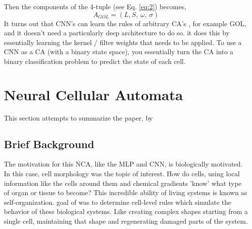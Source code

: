 Then the components of the 4-tuple (see Eq. \ref{eq:2}) becomes,
\begin{equation}
	\label{eq:2.4}
	A_{GOL} = (L, S, \ \omega , \ \sigma )
\end{equation}
It turns out that CNN's can learn the rules of arbitrary CA's \cite{PhysRevE}, for example GOL, and it doesn't need a particularly deep architecture to do so. it does this by essentially learning the kernel / filter weights that needs to be applied. To use a CNN as a CA (with a binary state space), you essentially turn the CA into a binary classification problem to predict the state of each cell.

\section{Neural Cellular Automata}

This section attempts to summarize the paper,  by \citeauthor{growing_nca} \cite{growing_nca}
\subsection{Brief Background}

The motivation for this NCA, like the MLP and CNN, is biologically motivated. In this case, cell morphology was the topic of interest. How do cells, using local information like the cells around them and chemical gradients 'know' what type of organ or tissue to become? This incredible ability of living systems is known as self-organization. goal of \citeauthor{growing_nca} was to determine cell-level rules which simulate the behavior of these biological systems. Like creating complex shapes  starting from a single cell, maintaining that shape and regenerating damaged parts of the system.


